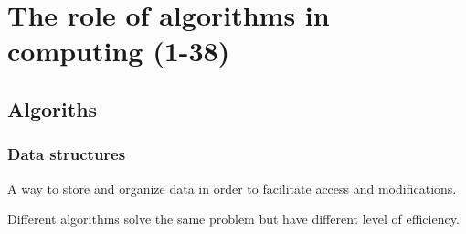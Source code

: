 \chapter{The role of algorithms in computing (1-38)}





\section{Algoriths}
\subsection{Data structures}

\begin{definition}\label{def:data_structure_1}
    A way to store and organize data in order to facilitate access and modifications.
\end{definition}

\begin{definition}[Efficiency]\label{def:efficiency_1}
    Different algorithms solve the same problem but have different level of efficiency.
    
\end{definition}

